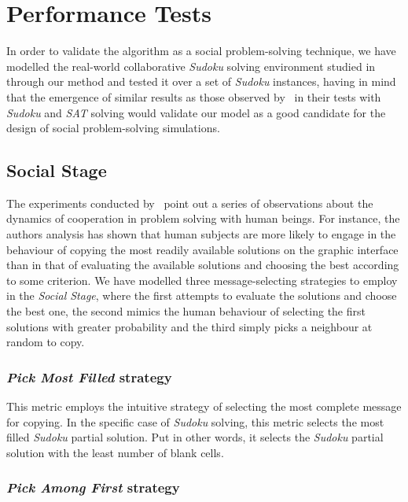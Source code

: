 \documentclass{article}
\begin{document}
\section{Performance Tests}

In order to validate the algorithm as a social problem-solving technique, we have modelled the real-world collaborative {\em Sudoku} solving environment studied in~\cite{farenzena:collabem} through our method and tested it over a set of {\em Sudoku} instances, having in mind that the emergence of similar results as those observed by~\cite{farenzena:collabem} in their tests with {\em Sudoku} and {\em SAT} solving would validate our model as a good candidate for the design of social problem-solving simulations.

\subsection{Social Stage} %

The experiments conducted by~\cite{farenzena:collabem} point out a series of observations about the dynamics of cooperation in problem solving with human beings. For instance, the authors analysis has shown that human subjects are more likely to engage in the behaviour of copying the most readily available solutions on the graphic interface than in that of evaluating the available solutions and choosing the best according to some criterion. We have modelled three message-selecting strategies to employ in the \emph{Social Stage}, where the first attempts to evaluate the solutions and choose the best one, the second mimics the human behaviour of selecting the first solutions with greater probability and the third simply picks a neighbour at random to copy.

\subsubsection{{\em Pick Most Filled} strategy}

This metric employs the intuitive strategy of selecting the most complete message for copying. In the specific case of {\em Sudoku} solving, this metric selects the most filled {\em Sudoku} partial solution. Put in other words, it selects the {\em Sudoku} partial solution with the least number of blank cells.

\subsubsection{{\em Pick Among First} strategy}
\end{document}
